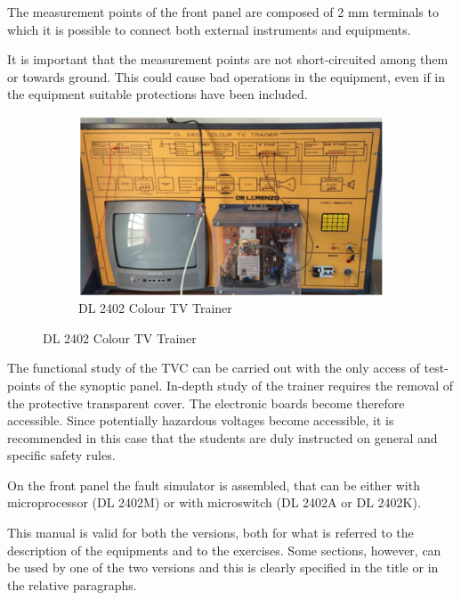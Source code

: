 \documentclass[a4paper,12pt]{article}
\begin{document}
	The measurement points of the front panel are composed of 2 mm terminals to which it is possible to connect both external instruments and equipments.
	
	It is important that the measurement points are not short-circuited among them or towards ground. This could cause bad operations in the equipment, even if in the equipment suitable protections have been included.

	
		\begin{figure}[H]
		\centering
		\begin{subfigure}[t]{0.49\textwidth}
			\centering
			\includegraphics[width=1\linewidth, height=0.205\textheight]{Images/2}
			\caption{DL 2402 Colour TV Trainer}
			\vspace{0.1cm}
		\end{subfigure}
	\end{figure}
		The functional study of the TVC can be carried out with the only access of test-points of the synoptic panel. In-depth study of the trainer requires the removal of the protective transparent cover. The electronic boards become therefore accessible.
	Since potentially hazardous voltages become accessible, it is recommended in this case that the students are duly instructed on general and specific safety rules.
	
	On the front panel the fault simulator is assembled, that can be either with microprocessor (DL 2402M) or with microswitch (DL 2402A or DL 2402K).
	
	This manual is valid for both the versions, both for what is referred to the description of the equipments and to the exercises. Some sections, however, can be used by one of the two versions and this is clearly specified in the title or in the relative paragraphs.
	
\end{document}
